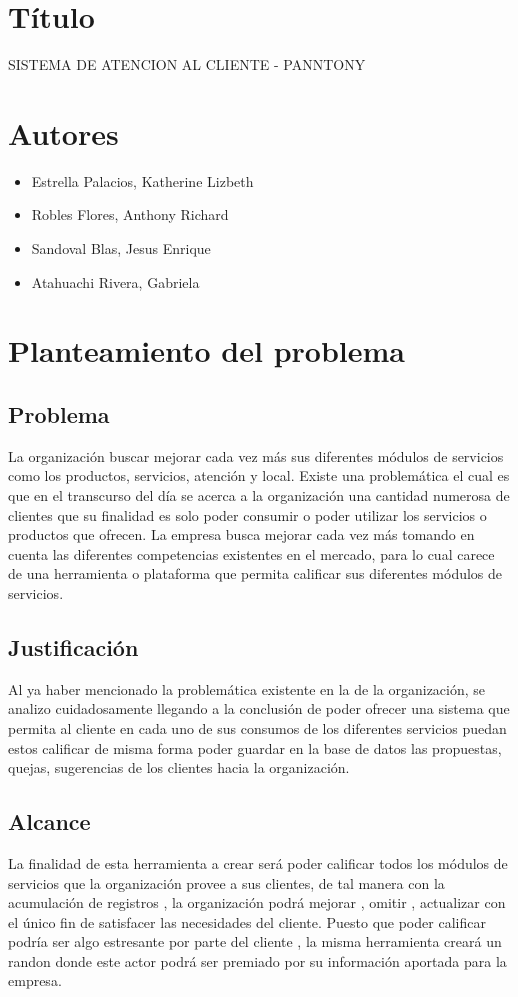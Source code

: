 \documentclass[preprint,12pt]{elsarticle}
\begin{document}
\section{Título}
SISTEMA DE ATENCION AL CLIENTE - PANNTONY

\section{Autores}
\begin{itemize}
	\item Estrella Palacios, Katherine Lizbeth
	\item Robles Flores, Anthony Richard
	\item Sandoval Blas, Jesus Enrique
	\item Atahuachi Rivera, Gabriela    
\end{itemize}

\section{Planteamiento del problema}
	\subsection{Problema }	
		La organización buscar mejorar cada vez más sus diferentes módulos de servicios como los productos, servicios, atención y local.
		Existe una problemática el cual es que en el transcurso del día se acerca a la organización una cantidad numerosa de clientes que su finalidad es solo poder consumir o poder utilizar los servicios o productos que ofrecen.
		La empresa busca mejorar cada vez más tomando en cuenta las diferentes competencias existentes en el mercado, para lo cual carece de una herramienta o plataforma que permita calificar sus diferentes módulos de servicios.

	\subsection{Justificación }	
		Al ya haber mencionado la problemática existente en la de la organización, se analizo cuidadosamente llegando  a la conclusión de poder ofrecer una sistema que permita al cliente en cada uno de sus consumos de los diferentes servicios puedan estos calificar de 			misma forma poder guardar en la base de datos las propuestas, quejas, sugerencias de los clientes hacia la organización.
	\subsection{Alcance }
		La finalidad de esta herramienta a crear será poder calificar todos los módulos de servicios que la organización provee a sus clientes, de tal manera con la acumulación de registros , la organización podrá mejorar , omitir , actualizar con el único fin de satisfacer las 			necesidades del cliente.
		Puesto que poder calificar podría ser algo estresante por parte del cliente , la misma herramienta creará un randon donde este actor podrá ser premiado por su información aportada para la empresa.
\end{document}
